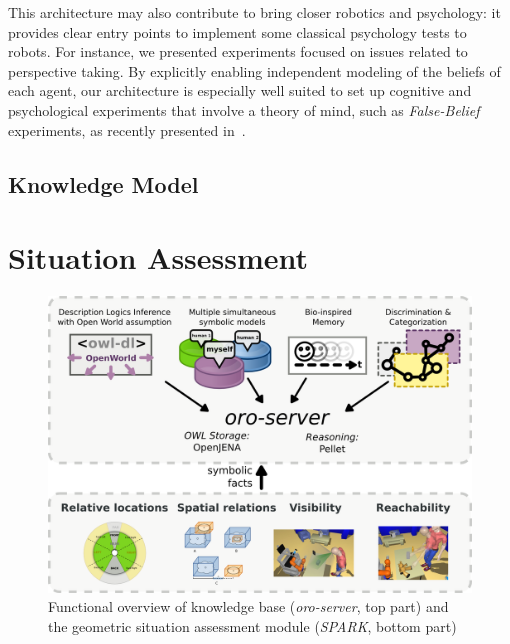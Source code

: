 \documentclass[letterpaper, 10 pt, conference]{ieeeconf}  %
\begin{document}
This architecture may also contribute to bring closer robotics and psychology:
it provides clear entry points to implement some classical psychology tests to
robots. For instance, we presented experiments focused on issues related to
perspective taking. By explicitly enabling independent modeling of the beliefs
of each agent, our architecture is especially well suited to set up cognitive
and psychological experiments that involve a theory of mind, such as
\emph{False-Belief} experiments, as recently presented in~\cite{Warnier2012a}.

\subsection{Knowledge Model}

\cite{Lemaignan2010}

\section{Situation Assessment}
\label{sect|sit-ass}

\begin{figure}
        \centering
        \includegraphics[width=\columnwidth]{spark-oro}
        \caption{Functional overview of knowledge base (\emph{oro-server}, top part) and the geometric situation assessment module (\emph{SPARK}, bottom part)}
        \label{fig|spark-oro}
\end{figure}

\cite{Sisbot2011}

\end{document}
